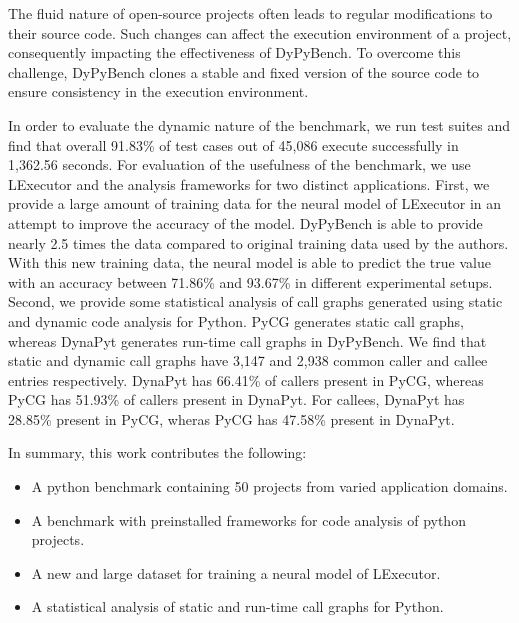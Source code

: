 The fluid nature of open-source projects often leads to regular modifications to their source code.
Such changes can affect the execution environment of a project, consequently impacting the effectiveness of DyPyBench.
To overcome this challenge, DyPyBench clones a stable and fixed version of the source code to ensure consistency in the execution environment.

In order to evaluate the dynamic nature of the benchmark, we run test suites and find that overall 91.83\% of test cases out of 45,086 execute successfully in 1,362.56 seconds.
For evaluation of the usefulness of the benchmark, we use LExecutor and the analysis frameworks for two distinct applications.
First, we provide a large amount of training data for the neural model of LExecutor in an attempt to improve the accuracy of the model.
DyPyBench is able to provide nearly 2.5 times the data compared to original training data used by the authors.
With this new training data, the neural model is able to predict the true value with an accuracy between 71.86\% and 93.67\% in different experimental setups.
Second, we provide some statistical analysis of call graphs generated using static and dynamic code analysis for Python.
PyCG generates static call graphs, whereas DynaPyt generates run-time call graphs in DyPyBench.
We find that static and dynamic call graphs have 3,147 and 2,938 common caller and callee entries respectively.
DynaPyt has 66.41\% of callers present in PyCG, whereas PyCG has 51.93\% of callers present in DynaPyt.
For callees, DynaPyt has 28.85\% present in PyCG, wheras PyCG has 47.58\% present in DynaPyt.

In summary, this work contributes the following:
\begin{itemize}
    \item A python benchmark containing 50 projects from varied application domains.
    \item A benchmark with preinstalled frameworks for code analysis of python projects.
    \item A new and large dataset for training a neural model of LExecutor.
    \item A statistical analysis of static and run-time call graphs for Python.
\end{itemize}

